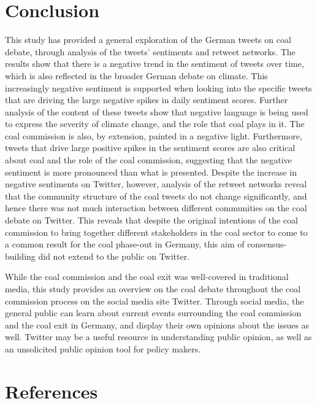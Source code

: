\documentclass[12pt,onecolumn,twoside]{layout}
\begin{document}
\section{Conclusion} \label{sec:conclusion}
This study has provided a general exploration of the German tweets on coal debate, through analysis of the tweets' sentiments and retweet networks. The results show that there is a negative trend in the sentiment of tweets over time, which is also reflected in the broader German debate on climate. This increasingly negative sentiment is supported when looking into the specific tweets that are driving the large negative spikes in daily sentiment scores. Further analysis of the content of these tweets show that negative language is being used to express the severity of climate change, and the role that coal plays in it. The coal commission is also, by extension, painted in a negative light. Furthermore, tweets that drive large positive spikes in the sentiment scores are also critical about coal and the role of the coal commission, suggesting that the negative sentiment is more pronounced than what is presented. Despite the increase in negative sentiments on Twitter, however, analysis of the retweet networks reveal that the community structure of the coal tweets do not change significantly, and hence there was not much interaction between different communities on the coal debate on Twitter. This reveals that despite the original intentions of the coal commission to bring together different stakeholders in the coal sector to come to a common result for the coal phase-out in Germany, this aim of consensus-building did not extend to the public on Twitter. 

While the coal commission and the coal exit was well-covered in traditional media, this study provides an overview on the coal debate throughout the coal commission process on the social media site Twitter. Through social media, the general public can learn about current events surrounding the coal commission and the coal exit in Germany, and display their own opinions about the issues as well. Twitter may be a useful resource in understanding public opinion, as well as an unsolicited public opinion tool for policy makers. 



\clearpage
\section*{References}

\end{document}
